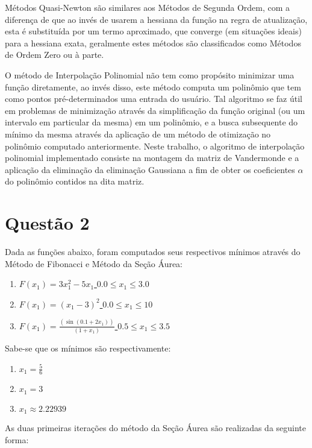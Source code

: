 \documentclass[fleqn, 11pt]{article}
\begin{document}
Métodos Quasi-Newton são similares aos Métodos de Segunda Ordem, com a diferença de que ao invés de usarem a hessiana da função na regra de atualização, esta é substituída por um termo aproximado, que converge (em situações ideais) para a hessiana exata, geralmente estes métodos são classificados como Métodos de Ordem Zero ou à parte.\newline

O método de Interpolação Polinomial não tem como propósito minimizar uma função diretamente, ao invés disso, este método computa um polinômio que tem como pontos pré-determinados uma entrada do usuário. Tal algoritmo se faz útil em problemas de minimização através da simplificação da função original (ou um intervalo em particular da mesma) em um polinômio, e a busca subsequente do mínimo da mesma através da aplicação de um método de otimização no polinômio computado anteriormente. Neste trabalho, o algoritmo de interpolação polinomial implementado consiste na montagem da matriz de Vandermonde e a aplicação da eliminação da eliminação Gaussiana a fim de obter os coeficientes $\alpha$ do polinômio contidos na dita matriz.

\section*{Questão 2}
Dada as funções abaixo, foram computados seus respectivos mínimos através do Método de Fibonacci e Método da Seção Áurea:
\begin{enumerate}[label=(\alph*)]
\item \hyperref[Q2A]{$F(x_1) = 3 x_1^2-5 x_1$ \hfill $0.0 \leq x_1 \leq 3.0$}
\item \hyperref[Q2B]{$F(x_1) = (x_1-3)^2    $ \hfill $0.0 \leq x_1 \leq 10$}
\item \hyperref[Q2C]{$F(x_1) = \frac{(\sin(0.1+2 x_1))}{(1+x_1)}$ \hfill $0.5 \leq x_1 \leq 3.5$  }
\end{enumerate}

Sabe-se que os mínimos são respectivamente:
\begin{enumerate}[label=(\alph*)]
\item $x_1 = \frac{5}{6}$
\item $x_1 = 3$
\item $x_1 \approx 2.22939$
\end{enumerate}


As duas primeiras iterações do método da Seção Áurea são realizadas da seguinte forma:
\newline
\end{document}
